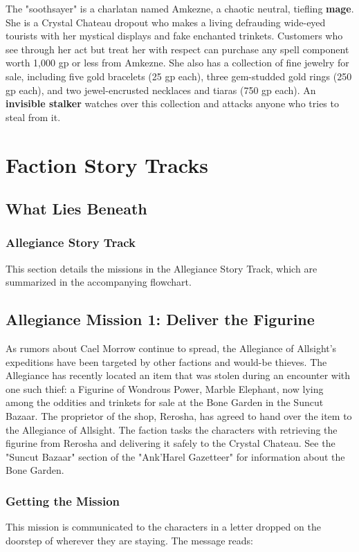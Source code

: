 \documentclass[10pt,a4paper,twoside,fancy,bg=print,twocolumn,openany,nodeprecatedcode]{dndbook}
\begin{document}
The "soothsayer" is a charlatan named Amkezne, a chaotic neutral, tiefling \textbf{mage}. She is a Crystal Chateau dropout who makes a living defrauding wide-eyed tourists with her mystical displays and fake enchanted trinkets. Customers who see through her act but treat her with respect can purchase any spell component worth 1,000 gp or less from Amkezne. She also has a collection of fine jewelry for sale, including five gold bracelets (25 gp each), three gem-studded gold rings (250 gp each), and two jewel-encrusted necklaces and tiaras (750 gp each). An \textbf{invisible stalker} watches over this collection and attacks anyone who tries to steal from it.

\section{Faction Story Tracks}
\subsection{What Lies Beneath}
\subsubsection{Allegiance Story Track}
This section details the missions in the Allegiance Story Track, which are summarized in the accompanying flowchart.

\subsection{Allegiance Mission 1: Deliver the Figurine}
As rumors about Cael Morrow continue to spread, the Allegiance of Allsight's expeditions have been targeted by other factions and would-be thieves. The Allegiance has recently located an item that was stolen during an encounter with one such thief: a Figurine of Wondrous Power, Marble Elephant, now lying among the oddities and trinkets for sale at the Bone Garden in the Suncut Bazaar. The proprietor of the shop, Rerosha, has agreed to hand over the item to the Allegiance of Allsight. The faction tasks the characters with retrieving the figurine from Rerosha and delivering it safely to the Crystal Chateau. See the "Suncut Bazaar" section of the "Ank'Harel Gazetteer" for information about the Bone Garden.

\subsubsection{Getting the Mission}
This mission is communicated to the characters in a letter dropped on the doorstep of wherever they are staying. The message reads:
\end{document}

